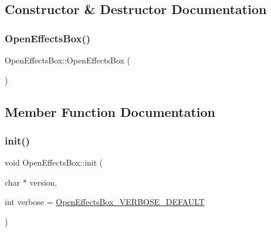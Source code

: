 \subsection{Constructor \& Destructor Documentation}
\mbox{\label{class_open_effects_box_a20aa735d1c8ea776c6ec21087fc2d23a}} 
\subsubsection{\texorpdfstring{Open\+Effects\+Box()}{OpenEffectsBox()}}
{\footnotesize\ttfamily Open\+Effects\+Box\+::\+Open\+Effects\+Box (\begin{DoxyParamCaption}{ }\end{DoxyParamCaption})}



\subsection{Member Function Documentation}
\mbox{\label{class_open_effects_box_aea127362d5b00701ced70f20f728b60f}} 
\subsubsection{\texorpdfstring{init()}{init()}}
{\footnotesize\ttfamily void Open\+Effects\+Box\+::init (\begin{DoxyParamCaption}\item[{char $\ast$}]{version,  }\item[{int}]{verbose = {\ttfamily \mbox{\hyperlink{_open_effects_box_8h_aa08a10c75cee6b15fc7197be8c849b48}{Open\+Effects\+Box\+\_\+\+V\+E\+R\+B\+O\+S\+E\+\_\+\+D\+E\+F\+A\+U\+LT}}} }\end{DoxyParamCaption})}

